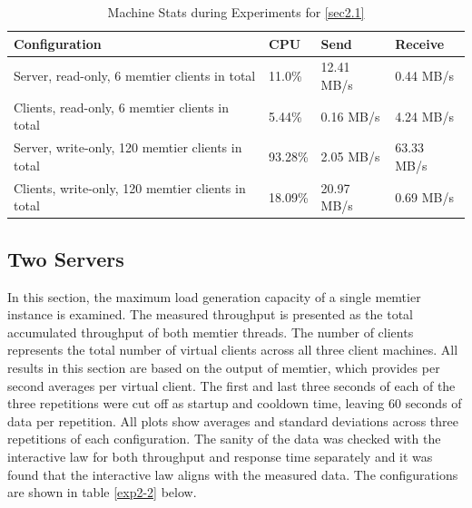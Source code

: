 \documentclass[11pt,a4paper]{article}
\begin{document}
\begin{center}
    \begin{table}
    	\begin{tabular}{|l|p{2cm}|p{2cm}|p{2cm}|}
            \hline \textbf{Configuration} & \textbf{CPU} & \textbf{Send} & \textbf{Receive}\\
            \hline Server, read-only, 6 memtier clients in total & 11.0\%         & 12.41 MB/s    & 0.44 MB/s\\
            \hline Clients, read-only, 6 memtier clients in total & 5.44\%           & 0.16 MB/s     & 4.24 MB/s\\
            \hline Server, write-only,  120 memtier clients in total & 93.28\%        & 2.05 MB/s     & 63.33 MB/s\\
            \hline Clients, write-only, 120 memtier clients in total & 18.09\%       & 20.97 MB/s     & 0.69 MB/s\\
            \hline
    	\end{tabular}
	\caption{Machine Stats during Experiments for \autoref{sec2.1}}
    \label{dstat:2-1}
	\end{table}
\end{center}

\subsection{Two Servers} \label{sec2.2}
In this section, the maximum load generation capacity of a single memtier instance is examined. The measured throughput is presented as the total accumulated throughput of both memtier threads. The number of clients represents the total number of virtual clients across all three client machines. All results in this section are based on the output of memtier, which provides per second averages per virtual client. The first and last three seconds of each of the three repetitions were cut off as startup and cooldown time, leaving 60 seconds of data per repetition. All plots show averages and standard deviations across three repetitions of each configuration. The sanity of the data was checked with the interactive law for both throughput and response time separately and it was found that the interactive law aligns with the measured data. The configurations are shown in table \autoref{exp2-2} below.
\end{document}
